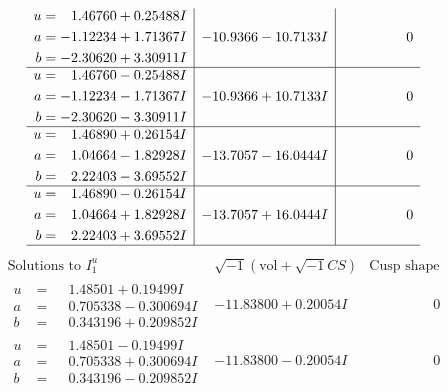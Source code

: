 \documentclass[1p]{elsarticle_modified}
\theoremstyle{definition}
\newcommand{\I}{\sqrt{-1}}
\begin{document}
$$\begin{array}{c|c|c}
\begin{aligned}
u &= \phantom{-}1.46760 + 0.25488 I \\
a &= -1.12234 + 1.71367 I \\
b &= -2.30620 + 3.30911 I\end{aligned}
 & -10.9366 - 10.7133 I & \phantom{-0.000000 } 0 \\ \hline\begin{aligned}
u &= \phantom{-}1.46760 - 0.25488 I \\
a &= -1.12234 - 1.71367 I \\
b &= -2.30620 - 3.30911 I\end{aligned}
 & -10.9366 + 10.7133 I & \phantom{-0.000000 } 0 \\ \hline\begin{aligned}
u &= \phantom{-}1.46890 + 0.26154 I \\
a &= \phantom{-}1.04664 - 1.82928 I \\
b &= \phantom{-}2.22403 - 3.69552 I\end{aligned}
 & -13.7057 - 16.0444 I & \phantom{-0.000000 } 0 \\ \hline\begin{aligned}
u &= \phantom{-}1.46890 - 0.26154 I \\
a &= \phantom{-}1.04664 + 1.82928 I \\
b &= \phantom{-}2.22403 + 3.69552 I\end{aligned}
 & -13.7057 + 16.0444 I & \phantom{-0.000000 } 0\\
 \hline 
 \end{array}$$\newpage$$\begin{array}{c|c|c}  
\text{Solutions to }I^u_{1}& \I (\text{vol} + \sqrt{-1}CS) & \text{Cusp shape}\\
 \hline 
\begin{aligned}
u &= \phantom{-}1.48501 + 0.19499 I \\
a &= \phantom{-}0.705338 - 0.300694 I \\
b &= \phantom{-}0.343196 + 0.209852 I\end{aligned}
 & -11.83800 + 0.20054 I & \phantom{-0.000000 } 0 \\ \hline\begin{aligned}
u &= \phantom{-}1.48501 - 0.19499 I \\
a &= \phantom{-}0.705338 + 0.300694 I \\
b &= \phantom{-}0.343196 - 0.209852 I\end{aligned}
 & -11.83800 - 0.20054 I & \phantom{-0.000000 } 0 \\ \hline\begin{aligned}

\end{aligned}
\end{array}$$
\end{document}
